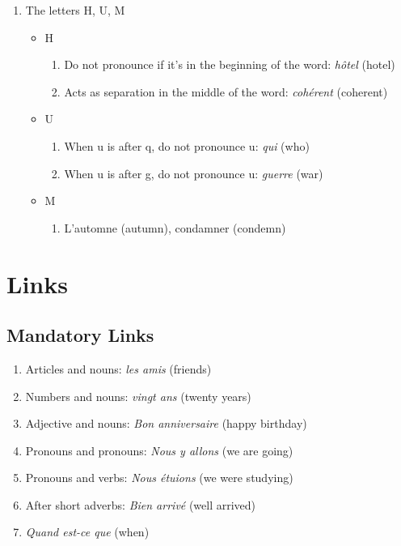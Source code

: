 \documentclass{book}
\begin{document}
\begin{enumerate}
        \item The letters H, U, M
            \begin{itemize}
                \item H
                    \begin{enumerate}
                        \item Do not pronounce if it's in the beginning of the word: \textit{hôtel} \textipa{[Otel]} (hotel)
                        \item Acts as separation in the middle of the word: \textit{cohérent} \textipa{[ko.eR\~{a}]} (coherent)
                    \end{enumerate}
                \item U
                    \begin{enumerate}
                        \item When u is after q, do not pronounce u: \textit{qui} \textipa{[ki]} (who)
                        \item When u is after g, do not pronounce u: \textit{guerre} \textipa{[gER]} (war)
                    \end{enumerate}
                \item M
                    \begin{enumerate}
                        \item L'automne \textipa{[lotOm]} (autumn), condamner \textipa{[kO.damne]} (condemn)
                    \end{enumerate}
            \end{itemize}
    \end{enumerate}

\chapter{Links}
    \section{Mandatory Links}
        \begin{enumerate}
            \item Articles and nouns: \textit{les amis} \textipa{[le.zami]} (friends)
            \item Numbers and nouns: \textit{vingt ans} \textipa{[v\~{a}z]} (twenty years)
            \item Adjective and nouns: \textit{Bon anniversaire} \textipa{[bOnanivERsER]} (happy birthday)
            \item Pronouns and pronouns: \textit{Nous y allons} \textipa{[nu.zi.al\~{O}]} (we are going)
            \item Pronouns and verbs: \textit{Nous étuions} \textipa{[nu.zetudj\~{O}]} (we were studying)
            \item After short adverbs: \textit{Bien arrivé} \textipa{[bj\~{a}nari.ve]} (well arrived)
            \item \textit{Quand est-ce que} \textipa{[k\~{a}tEstk@]} (when)
        \end{enumerate}
\end{document}
